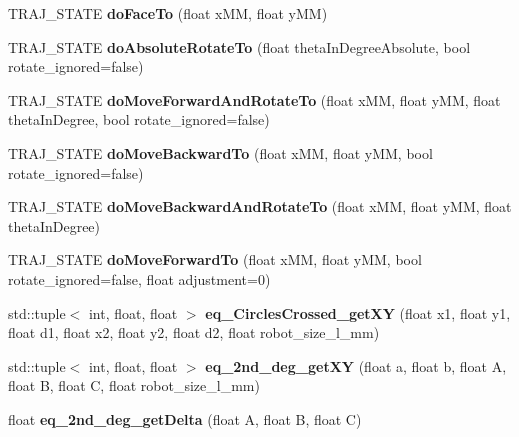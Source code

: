 \begin{DoxyCompactItemize}
T\+R\+A\+J\+\_\+\+S\+T\+A\+TE {\bfseries do\+Face\+To} (float x\+MM, float y\+MM)
\item 
\mbox{\label{classAsserv_ad41f75a5793e8990b2c70880b0011129}} 
T\+R\+A\+J\+\_\+\+S\+T\+A\+TE {\bfseries do\+Absolute\+Rotate\+To} (float theta\+In\+Degree\+Absolute, bool rotate\+\_\+ignored=false)
\item 
\mbox{\label{classAsserv_a15a5f1ec018cdc2624ea869a4e1dd6e7}} 
T\+R\+A\+J\+\_\+\+S\+T\+A\+TE {\bfseries do\+Move\+Forward\+And\+Rotate\+To} (float x\+MM, float y\+MM, float theta\+In\+Degree, bool rotate\+\_\+ignored=false)
\item 
\mbox{\label{classAsserv_aa2ec3b84e3cccf2145cc70e33f08dc58}} 
T\+R\+A\+J\+\_\+\+S\+T\+A\+TE {\bfseries do\+Move\+Backward\+To} (float x\+MM, float y\+MM, bool rotate\+\_\+ignored=false)
\item 
\mbox{\label{classAsserv_af438189501d475dcb6632ce63efe5e5f}} 
T\+R\+A\+J\+\_\+\+S\+T\+A\+TE {\bfseries do\+Move\+Backward\+And\+Rotate\+To} (float x\+MM, float y\+MM, float theta\+In\+Degree)
\item 
\mbox{\label{classAsserv_a960679fed5ab18f631d7847c95fc1f85}} 
T\+R\+A\+J\+\_\+\+S\+T\+A\+TE {\bfseries do\+Move\+Forward\+To} (float x\+MM, float y\+MM, bool rotate\+\_\+ignored=false, float adjustment=0)
\item 
\mbox{\label{classAsserv_a9ae528690268f84726565305c42718e5}} 
std\+::tuple$<$ int, float, float $>$ {\bfseries eq\+\_\+Circles\+Crossed\+\_\+get\+XY} (float x1, float y1, float d1, float x2, float y2, float d2, float robot\+\_\+size\+\_\+l\+\_\+mm)
\item 
\mbox{\label{classAsserv_a744a8285ae7c6339252458a9c94fd602}} 
std\+::tuple$<$ int, float, float $>$ {\bfseries eq\+\_\+2nd\+\_\+deg\+\_\+get\+XY} (float a, float b, float A, float B, float C, float robot\+\_\+size\+\_\+l\+\_\+mm)
\item 
\mbox{\label{classAsserv_adb57afce5f18ec54425fcf5e8d54da75}} 
float {\bfseries eq\+\_\+2nd\+\_\+deg\+\_\+get\+Delta} (float A, float B, float C)
\item 

\end{DoxyCompactItemize}
